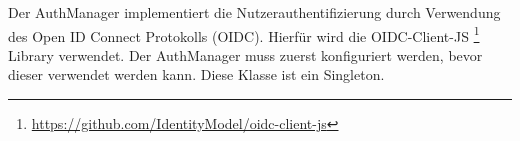 Der AuthManager implementiert die Nutzerauthentifizierung durch Verwendung des Open ID Connect Protokolls (OIDC).
Hierfür wird die OIDC-Client-JS \footnote{\href{https://github.com/IdentityModel/oidc-client-js}{https://github.com/IdentityModel/oidc-client-js}} Library verwendet.
Der AuthManager muss zuerst konfiguriert werden, bevor dieser verwendet werden kann.
Diese Klasse ist ein Singleton.